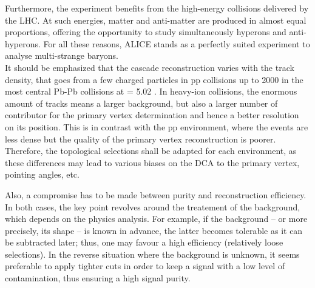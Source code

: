 Furthermore, the experiment benefits from the high-energy collisions delivered by the LHC. At such energies, matter and anti-matter are produced in almost equal proportions, offering the opportunity to study simultaneously hyperons and anti-hyperons. For all these reasons, ALICE stands as a perfectly suited experiment to analyse multi-strange baryons. \\

It should be emphasized that the cascade reconstruction varies with the track density, that goes from a few charged particles in pp collisions up to 2000 in the most central Pb-Pb collisions at \sqrtSnn = 5.02 \tev \cite{alicecollaborationCentralityDependenceChargedParticle2016}. In heavy-ion collisions, the enormous amount of tracks means a larger background, but also a larger number of contributor for the primary vertex determination and hence a better resolution on its position. This is in contrast with the pp environment, where the events are less dense but the quality of the primary vertex reconstruction is poorer. Therefore, the topological selections shall be adapted for each environment, as these differences may lead to various biases on the DCA to the primary vertex, pointing angles, etc.

Also, a compromise has to be made between purity and reconstruction efficiency. In both cases, the key point revolves around the treatement of the background, which depends on the physics analysis. For example, if the background -- or more precisely, its shape -- is known in advance, the latter becomes tolerable as it can be subtracted later; thus, one may favour a high efficiency (\ie relatively loose selections). In the reverse situation  where the background is unknown, it seems preferable to apply tighter cuts in order to keep a signal with a low level of contamination, thus ensuring a high signal purity.

